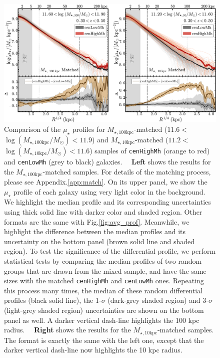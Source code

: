 \documentclass{emulateapj}
\def\rbcg{\texttt{cenHighMh}}
\def\nbcg{\texttt{cenLowMh}}
\def\minn{{$M_{\star,10\mathrm{kpc}}$}}
\def\mtot{{$M_{\star,100\mathrm{kpc}}$}}
\def\logminn{{$\log (M_{\star,10\mathrm{kpc}}/M_{\odot})$}}
\def\logmtot{{$\log (M_{\star,100\mathrm{kpc}}/M_{\odot})$}}
\def\mden{{$\mu_{\star}$}}
\newcommand{\update}[1]{\textcolor{Bittersweet}{#1}}
\begin{document}
\begin{CJK*}{UTF8}{gbsn}
  \begin{figure}[t!]
      \centering 
      \includegraphics[width=\textwidth]{fig/redbcg_prof_1}
      \caption{
          \update{
          Comparison of the \mden{} profiles for \mtot{}-matched ($11.6<$\logmtot{}$<11.9$) 
          and \minn{}-matched ($11.2<$\logminn{}$<11.6$) samples 
          of \rbcg{} (orange to red) and \nbcg{} (grey to black) galaxies.~~
          \textbf{Left} shows the results for the \mtot{}-matched samples.
          For details of the matching process, please see Appendix.\ref{app:match}.  
          On its upper panel, we show the \mden{} profile of each galaxy using very light 
          color in the background.  
          We highlight the median profile and its corresponding uncertainties using thick 
          solid line with darker color and shaded region. 
          Other formats are the same with Fig.\ref{fig:avg_prof}.
          Meanwhile, we highlight the difference between the median profiles and its 
          uncertainty on the bottom panel (brown solid line and shaded region).
          To test the significance of the differential profile, we perform statistical tests 
          by comparing the median profiles of two random groups that are drawn from the 
          mixed sample, and have the same sizes with the matched \rbcg{} and \nbcg{} ones.
          Repeating this process many times, the median of these random differential 
          profiles (black solid line), the 1-$\sigma$ (dark-grey shaded region) and 3-$\sigma$
          (light-grey shaded region) uncertainties are shown on the bottom panel as well. 
          A darker vertical dash-line highlights the 100 kpc radius.~~
          \textbf{Right} shows the results for the \minn{}-matched samples. 
          The format is exactly the same with the left one, except that the darker vertical 
          dash-line now highlights the 10 kpc radius.}
      }
      \label{fig:prof_1} 
  \end{figure}


\end{CJK*}
\end{document}

